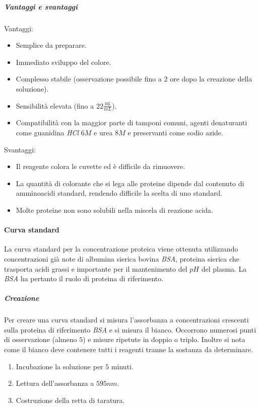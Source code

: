 				\subparagraph{Vantaggi e svantaggi}\mbox{}
				\begin{multicols}{2}
					Vantaggi:
					\begin{itemize}
						\item Semplice da preparare.
						\item Immediato sviluppo del colore.
						\item Complesso stabile (osservazione possibile fino a $2$ ore dopo la creazione della soluzione).
						\item Sensibilit\`a elevata (fino a $22\frac{\si{\micro\gram}}{\si{mL}}$).
						\item Compatibilit\`a con la maggior parte di tamponi comuni, agenti denaturanti come guanidina \emph{HCl} $6M$ e urea $8M$ e preservanti come sodio azide.
					\end{itemize}
					\columnbreak
					Svantaggi:
					\begin{itemize}
						\item Il reagente colora le cuvette ed \`e difficile da rimuovere.
						\item La quantit\`a di colorante che si lega alle proteine dipende dal contenuto di amminoacidi standard, rendendo difficile la scelta di uno standard.
						\item Molte proteine non sono solubili nella miscela di reazione acida.
					\end{itemize}
				\end{multicols}

			\paragraph{Curva standard}
			La curva standard per la concentrazione proteica viene ottenuta utilizzando concentrazioni gi\`a note di albumina sierica bovina \emph{BSA}, proteina sierica che trasporta acidi grassi e importante per il mantenimento del $pH$ del plasma.
			La \emph{BSA} ha pertanto il ruolo di proteina di riferimento.
			
				\subparagraph{Creazione}
				Per creare una curva standard si misura l'assorbanza a concentrazioni crescenti sulla proteina di riferimento \emph{BSA} e si misura il bianco.
				Occorrono numerosi punti di osservazione (almeno $5$) e misure ripetute in doppio o triplo.
				Inoltre si nota come il bianco deve contenere tutti i reagenti tranne la sostanza da determinare.
				\begin{enumerate}
					\item Incubazione la soluzione per $5$ minuti.
					\item Lettura dell'assorbanza a $595\si{nm}$.
					\item Costruzione della retta di taratura.
				\end{enumerate}

